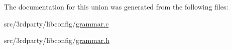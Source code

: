 The documentation for this union was generated from the following files:\begin{DoxyCompactItemize}
\item 
src/3rdparty/libconfig/\hyperlink{grammar_8c}{grammar.c}\item 
src/3rdparty/libconfig/\hyperlink{grammar_8h}{grammar.h}\end{DoxyCompactItemize}
